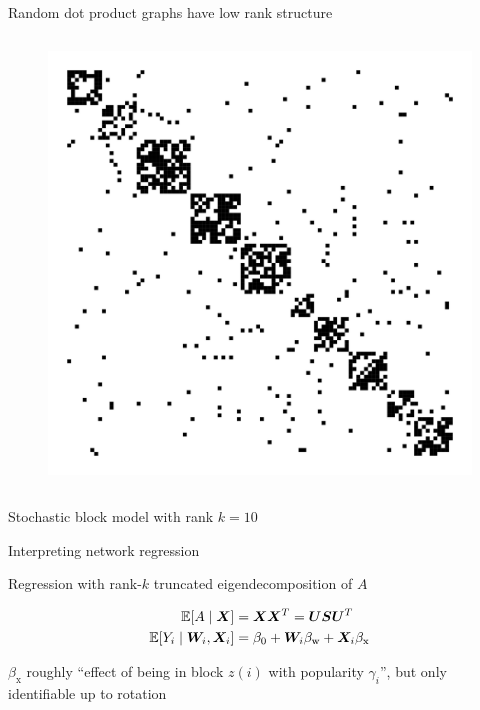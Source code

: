 \documentclass{beamer}
\theoremstyle{remark}
\newcommand{\X}{\bm X}
\newcommand{\W}{\bm W}
\newcommand{\Spop}{\bm S}
\newcommand{\Upop}{\bm U}
\newcommand{\betazero}{\beta_0}
\DeclarePairedDelimiter{\brac}{[}{]}
\newcommand{\E}[2][]{%
   \ifthenelse{ \equal{#1}{} }
      {\ensuremath{\mathbb{E} \brac*{#2}}}
      {\ensuremath{\mathbb{E} \brac*{#2 \mid #1}}}
}
\begin{document}
\begin{frame}{Random dot product graphs have low rank structure}
\begin{columns}
        \begin{figure}
            \includegraphics[width=\textwidth]{figures/presentation/adjacency-sample.png}
        \end{figure}

    \end{columns}

    \centering
    Stochastic block model with rank $k = 10$

\end{frame}

\begin{frame}{Interpreting network regression}

    Regression with rank-$k$ truncated eigendecomposition of $A$

    \begin{align*}
        \E[\X]{A}           & = \X \X^T = \Upop \Spop \Upop^T                         \\
        \E[\W_i, \X_i]{Y_i} & = \betazero + \W_i \beta_\text{w} + \X_i \beta_\text{x}
    \end{align*}

    $\beta_\text{x}$ roughly ``effect of being in block $z(i)$ with popularity $\gamma_i$'', but only identifiable up to rotation

\end{frame}
\end{document}
